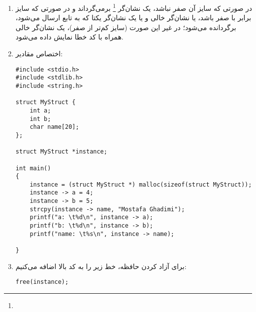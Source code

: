 
\begin{enumerate}
	\item در صورتی که سایز آن صفر نباشد، یک نشان‌گر \footnote{} برمی‌گرداند و در صورتی که سایز برابر با صفر باشد، یا نشان‌گر خالی و یا یک نشان‌گر یکتا که به تابع   ارسال می‌شود، برگردانده می‌شود؛ در غیر این صورت (سایز کم‌تر از صفر)، یک نشان‌گر خالی همراه با کد خطا نمایش داده می‌شود.
	\item اختصاص مقادیر:
	
	\begin{Verbatim}[tabsize=4]
#include <stdio.h>
#include <stdlib.h>
#include <string.h>

struct MyStruct {
	int a;
	int b;
	char name[20];
};

struct MyStruct *instance;

int main()
{
	instance = (struct MyStruct *) malloc(sizeof(struct MyStruct));
	instance -> a = 4;
	instance -> b = 5;
	strcpy(instance -> name, "Mostafa Ghadimi");
	printf("a: \t%d\n", instance -> a);
	printf("b: \t%d\n", instance -> b);
	printf("name: \t%s\n", instance -> name);

}
	\end{Verbatim}
	
	\item برای آزاد کردن حافظه، خط زیر را به کد بالا اضافه می‌کنیم:

	\begin{Verbatim}[tabsize=4]
free(instance);	
	\end{Verbatim}
\end{enumerate}
\newpage
